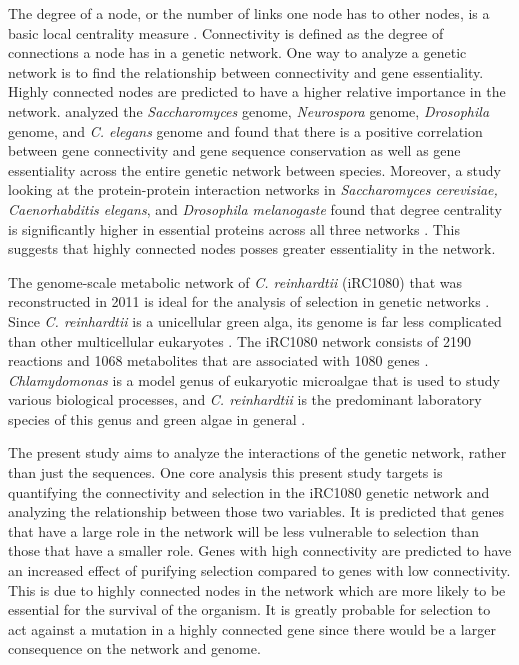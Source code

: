 \documentclass[letterpaper, 10 pt, conference]{ieeeconf}  %
\begin{document}
\setlength{\parindent}{10ex}The degree of a node, or the number of links one node has to other nodes, is a basic local centrality measure \cite{bo04}. Connectivity is defined as the degree of connections a node has in a genetic network. One way to analyze a genetic network is to find the relationship between connectivity and gene essentiality. Highly connected nodes are predicted to have a higher relative importance in the network. \cite{carl} analyzed the \textit{Saccharomyces} genome, \textit{Neurospora} genome, \textit{Drosophila} genome, and \textit{C. elegans} genome and found that there is a positive correlation between gene connectivity and gene sequence conservation as well as gene essentiality across the entire genetic network between species. Moreover, a study looking at the protein-protein interaction networks in \textit{Saccharomyces cerevisiae, Caenorhabditis elegans}, and \textit{Drosophila melanogaste} found that degree centrality is significantly higher in essential proteins across all three networks \cite{hk04}. This suggests that highly connected nodes posses greater essentiality in the network. 

\setlength{\parindent}{10ex}
The genome-scale metabolic network of \textit{C. reinhardtii} (iRC1080) that was reconstructed in 2011 is ideal for the analysis of selection in genetic networks \cite{Chang1}. Since \textit{C. reinhardtii} is a unicellular green alga, its genome is far less complicated than other multicellular eukaryotes \cite{Merchant245}. The iRC1080 network consists of 2190 reactions and 1068 metabolites that are associated with 1080 genes \cite{Chang1}. \textit{Chlamydomonas} is a model genus of eukaryotic microalgae that is used to study various biological processes, and \textit{C. reinhardtii} is the predominant laboratory species of this genus and green algae in general \cite{eliz}. 

\setlength{\parindent}{10ex}
The present study aims to analyze the interactions of the genetic network, rather than just the sequences. One core analysis this present study targets is quantifying the connectivity and selection in the iRC1080 genetic network and analyzing the relationship between those two variables. It is predicted that genes that have a large role in the network will be less vulnerable to selection than those that have a smaller role. Genes with high connectivity are predicted to have an increased effect of purifying selection compared to genes with low connectivity.  This is due to highly connected nodes in the network which are more likely to be essential for the survival of the organism. It is greatly probable for selection to act against a mutation in a highly connected gene since there would be a larger consequence on the network and genome.
\end{document}
